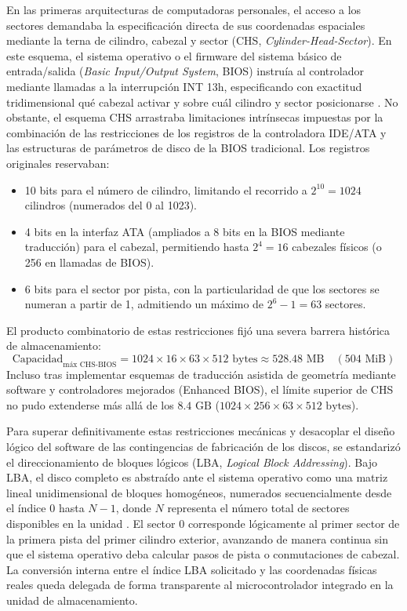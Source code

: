 \documentclass[12pt]{article}
\begin{document}
En las primeras arquitecturas de computadoras personales, el acceso a los sectores demandaba la especificación directa de sus coordenadas espaciales mediante la terna de cilindro, cabezal y sector (CHS, \textit{Cylinder-Head-Sector}). En este esquema, el sistema operativo o el firmware del sistema básico de entrada/salida (\textit{Basic Input/Output System}, BIOS) instruía al controlador mediante llamadas a la interrupción INT 13h, especificando con exactitud tridimensional qué cabezal activar y sobre cuál cilindro y sector posicionarse \parencite[\S 7.4, pp.\ 377--378]{carretero2001sistemas}. No obstante, el esquema CHS arrastraba limitaciones intrínsecas impuestas por la combinación de las restricciones de los registros de la controladora IDE/ATA y las estructuras de parámetros de disco de la BIOS tradicional. Los registros originales reservaban:
\begin{itemize}[noitemsep, topsep=2pt]
    \item 10 bits para el número de cilindro, limitando el recorrido a $2^{10} = 1024$ cilindros (numerados del 0 al 1023).
    \item 4 bits en la interfaz ATA (ampliados a 8 bits en la BIOS mediante traducción) para el cabezal, permitiendo hasta $2^4 = 16$ cabezales físicos (o 256 en llamadas de BIOS).
    \item 6 bits para el sector por pista, con la particularidad de que los sectores se numeran a partir de 1, admitiendo un máximo de $2^6 - 1 = 63$ sectores.
\end{itemize}

El producto combinatorio de estas restricciones fijó una severa barrera histórica de almacenamiento:
\begin{equation}
    \text{Capacidad}_{\text{máx CHS-BIOS}} = 1024 \times 16 \times 63 \times 512\text{ bytes} \approx 528.48\text{ MB} \quad (504\text{ MiB})
\end{equation}
Incluso tras implementar esquemas de traducción asistida de geometría mediante software y controladores mejorados (Enhanced BIOS), el límite superior de CHS no pudo extenderse más allá de los $8.4\text{ GB}$ ($1024 \times 256 \times 63 \times 512\text{ bytes}$).

Para superar definitivamente estas restricciones mecánicas y desacoplar el diseño lógico del software de las contingencias de fabricación de los discos, se estandarizó el direccionamiento de bloques lógicos (LBA, \textit{Logical Block Addressing}). Bajo LBA, el disco completo es abstraído ante el sistema operativo como una matriz lineal unidimensional de bloques homogéneos, numerados secuencialmente desde el índice $0$ hasta $N-1$, donde $N$ representa el número total de sectores disponibles en la unidad \parencite[\S 12.1, p.\ 409]{silberschatz2006fundamentos}. El sector 0 corresponde lógicamente al primer sector de la primera pista del primer cilindro exterior, avanzando de manera continua sin que el sistema operativo deba calcular pasos de pista o conmutaciones de cabezal. La conversión interna entre el índice LBA solicitado y las coordenadas físicas reales queda delegada de forma transparente al microcontrolador integrado en la unidad de almacenamiento.
\end{document}
